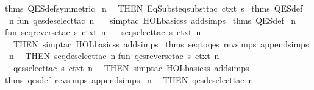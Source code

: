 \begin{isabellebody}
\isaantiq
thms\ QES{}def{}symmetric{}{}%
\endisaantiq
{}\ n\isanewline
\ \ THEN\ EqSubst{}eqsubst{}tac\ ctxt\ {}s{}\ %
\isaantiq
thms\ QES{}def{}%
\endisaantiq
\ n\isanewline
\isanewline
fun\ qes{}deselect{}tac\ n\ {}\isanewline
\ \ simp{}tac\ {}HOL{}basic{}ss\ addsimps\ %
\isaantiq
thms\ QES{}def{}%
\endisaantiq
{}\ n\isanewline
\isanewline
fun\ seq{}reverse{}tac\ s\ ctxt\ n\ {}\isanewline
\ \ seq{}select{}tac\ s\ ctxt\ n\isanewline
\ \ THEN\ simp{}tac\ {}HOL{}basic{}ss\ addsimps\ %
\isaantiq
thms\ seq{}to{}qes\ rev{}simps\ append{}simps{}%
\endisaantiq
{}\ n\isanewline
\ \ THEN\ seq{}deselect{}tac\ n\isanewline
\isanewline
fun\ qes{}reverse{}tac\ s\ ctxt\ n\ {}\isanewline
\ \ qes{}select{}tac\ s\ ctxt\ n\isanewline
\ \ THEN\ simp{}tac\ {}HOL{}basic{}ss\ addsimps\ %
\isaantiq
thms\ qes{}def\ rev{}simps\ append{}simps{}%
\endisaantiq
{}\ n\isanewline
\ \ THEN\ qes{}deselect{}tac\ n\isanewline
\isanewline
{}\isanewline

\end{isabellebody}
